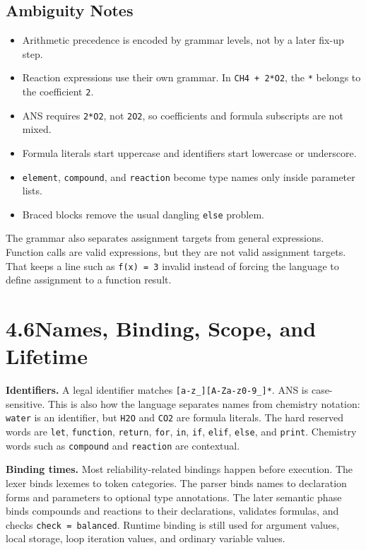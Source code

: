 \documentclass[11pt,a4paper]{article}
\newcommand{\code}[1]{\texttt{#1}}
\begin{document}
\subsection{Ambiguity Notes}
\begin{itemize}
  \item Arithmetic precedence is encoded by grammar levels, not by a later fix-up step.
  \item Reaction expressions use their own grammar. In \code{CH4 + 2*O2}, the \code{*} belongs to the coefficient \code{2}.
  \item ANS requires \code{2*O2}, not \code{2O2}, so coefficients and formula subscripts are not mixed.
  \item Formula literals start uppercase and identifiers start lowercase or underscore.
  \item \code{element}, \code{compound}, and \code{reaction} become type names only inside parameter lists.
  \item Braced blocks remove the usual dangling \code{else} problem.
\end{itemize}

The grammar also separates assignment targets from general expressions. Function calls are
valid expressions, but they are not valid assignment targets. That keeps a line such as
\code{f(x) = 3} invalid instead of forcing the language to define assignment to a function result.

\section{4.6\quad Names, Binding, Scope, and Lifetime}

\textbf{Identifiers.} A legal identifier matches \code{[a-z\_][A-Za-z0-9\_]*}. ANS is
case-sensitive. This is also how the language separates names from chemistry notation:
\code{water} is an identifier, but \code{H2O} and \code{CO2} are formula literals. The hard
reserved words are \code{let}, \code{function}, \code{return}, \code{for}, \code{in}, \code{if},
\code{elif}, \code{else}, and \code{print}. Chemistry words such as \code{compound} and
\code{reaction} are contextual.

\textbf{Binding times.} Most reliability-related bindings happen before execution. The lexer
binds lexemes to token categories. The parser binds names to declaration forms and parameters
to optional type annotations. The later semantic phase binds compounds and reactions to their
declarations, validates formulas, and checks \code{check = balanced}. Runtime binding is still used
for argument values, local storage, loop iteration values, and ordinary variable values.
\end{document}
